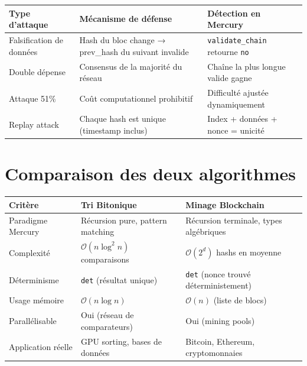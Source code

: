 \documentclass[12pt,a4paper]{article}
\newcommand{\Oh}[1]{\mathcal{O}\!\left(#1\right)}
\newcommand{\code}[1]{\texttt{\color{keywordcolor}#1}}
\begin{document}
\begin{center}
\begin{tabular}{p{4cm}p{5cm}p{5cm}}
\toprule
\textbf{Type d'attaque} & \textbf{Mécanisme de défense} & \textbf{Détection en Mercury} \\
\midrule
Falsification de données &
  Hash du bloc change → prev\_hash du suivant invalide &
  \code{validate\_chain} retourne \code{no} \\
\midrule
Double dépense &
  Consensus de la majorité du réseau &
  Chaîne la plus longue valide gagne \\
\midrule
Attaque 51\% &
  Coût computationnel prohibitif &
  Difficulté ajustée dynamiquement \\
\midrule
Replay attack &
  Chaque hash est unique (timestamp inclus) &
  Index + données + nonce = unicité \\
\bottomrule
\end{tabular}
\end{center}

\section{Comparaison des deux algorithmes}

\begin{center}
\begin{tabular}{lll}
\toprule
\textbf{Critère} & \textbf{Tri Bitonique} & \textbf{Minage Blockchain} \\
\midrule
Paradigme Mercury   & Récursion pure, pattern matching
                    & Récursion terminale, types algébriques \\
Complexité          & $\Oh{n\log^2 n}$ comparaisons
                    & $\Oh{2^d}$ hashs en moyenne \\
Déterminisme        & \code{det} (résultat unique)
                    & \code{det} (nonce trouvé déterministement) \\
Usage mémoire       & $\Oh{n\log n}$
                    & $\Oh{n}$ (liste de blocs) \\
Parallélisable      & Oui (réseau de comparateurs)
                    & Oui (mining pools) \\
Application réelle  & GPU sorting, bases de données
                    & Bitcoin, Ethereum, cryptomonnaies \\
\bottomrule
\end{tabular}
\end{center}
\end{document}
